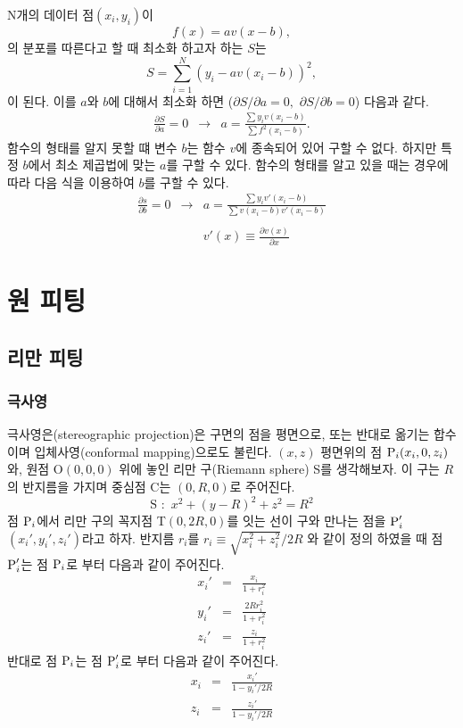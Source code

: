 \documentclass[chapter,a4paper,10pt]{oblivoir}
\begin{document}
N개의 데이터 점$(x_i, y_i)$이
\begin{equation}
f(x) = av(x-b),
\end{equation}
의 분포를 따른다고 할 때 최소화 하고자 하는 $S$는
\begin{equation}
S = \sum_{i=1}^N \left(y_i - av(x_i - b)\right)^2,
\end{equation}
이 된다. 이를 $a$와 $b$에 대해서 최소화 하면 
(${\partial S}/{\partial a} = 0,\,\,{\partial S}/{\partial b} = 0$) 
다음과 같다.
\begin{eqnarray}
\frac{\partial S}{\partial a} = 0 &\longrightarrow& a = \frac{\sum y_i v(x_i - b)}{\sum f^2(x_i - b)}.%
\end{eqnarray}
함수의 형태를 알지 못할 떄 변수 $b$는 함수 $v$에 종속되어 있어 구할 수 없다. 하지만 특정 $b$에서 최소 제곱법에 맞는 $a$를 구할 수 있다.
함수의 형태를 알고 있을 때는 경우에 따라 다음 식을 이용하여 $b$를 구할 수 있다.
\begin{eqnarray}
\frac{\partial s}{\partial b} = 0 &\longrightarrow& a = \frac{\sum y_i v'(x_i - b)}{\sum v(x_i - b)v'(x_i - b)}\\\nonumber\\
&&v'(x) \equiv \frac{\partial v(x)}{\partial x}
\end{eqnarray}

\chapter{원 피팅}
\section{리만 피팅}
\subsection{극사영}
극사영은(stereographic projection)은 구면의 점을 평면으로, 
또는 반대로 옮기는 합수이며 입체사영(conformal mapping)으로도 불린다.
$(x,z)$ 평면위의 점 $\textrm P_i(x_i,0,z_i)$와, 원점 O$(0,0,0)$ 위에 놓인
리만 구(Riemann sphere) S를 생각해보자.  
이 구는 $R$의 반지름을 가지며 중심점 C는 $(0, R, 0)$로 주어진다.
\begin{equation}
\textrm{S} \,\,:\,\, x^2 + (y-R)^2 + z^2 = R^2
\end{equation}
점 $\textrm P_i$에서 리만 구의 꼭지점 T$(0,2R,0)$를 잇는 선이 
구와 만나는 점을 $\textrm P_i'$$(x_i',y_i',z_i')$라고 하자.
반지름 $r_i$를 $r_i \equiv {\sqrt{x_i^2 + z_i^2}}/{2R}$ 와 같이 정의 하였을 때
점 $\textrm P_i'$는 점 $\textrm P_i$로 부터 다음과 같이 주어진다.
\begin{eqnarray} \label{XDataToXMap}
x_i' &=& \frac{x_i}{1 + r_i^2} \\
y_i' &=& \frac{2Rr_i^2}{1 + r_i^2} \nonumber\\
z_i' &=& \frac{z_i}{1 + r_i^2} \nonumber
\end{eqnarray}
반대로 점 $\textrm P_i$는 점 $\textrm P_i'$로 부터 다음과 같이 주어진다.
\begin{eqnarray}
x_i &=& \frac{x_i'}{1 - y_i'/2R} \\
z_i &=& \frac{z_i'}{1 - y_i'/2R} \nonumber
\end{eqnarray}
\end{document}
